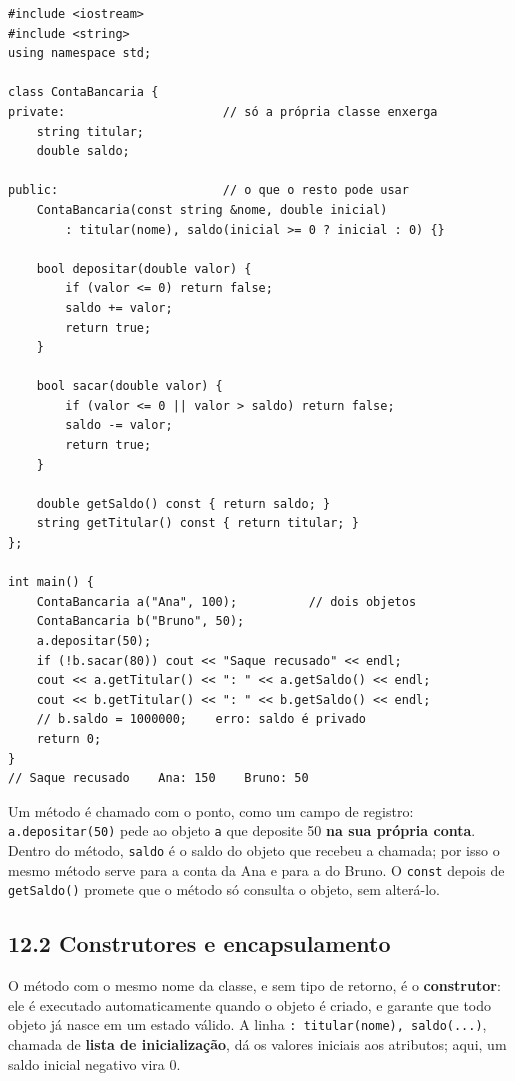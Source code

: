 \begin{codigo}
\begin{Verbatim}[breaklines=true, breaksymbolleft={}, fontsize=\footnotesize]
#include <iostream>
#include <string>
using namespace std;

class ContaBancaria {
private:                      // só a própria classe enxerga
    string titular;
    double saldo;

public:                       // o que o resto pode usar
    ContaBancaria(const string &nome, double inicial)
        : titular(nome), saldo(inicial >= 0 ? inicial : 0) {}

    bool depositar(double valor) {
        if (valor <= 0) return false;
        saldo += valor;
        return true;
    }

    bool sacar(double valor) {
        if (valor <= 0 || valor > saldo) return false;
        saldo -= valor;
        return true;
    }

    double getSaldo() const { return saldo; }
    string getTitular() const { return titular; }
};

int main() {
    ContaBancaria a("Ana", 100);          // dois objetos
    ContaBancaria b("Bruno", 50);
    a.depositar(50);
    if (!b.sacar(80)) cout << "Saque recusado" << endl;
    cout << a.getTitular() << ": " << a.getSaldo() << endl;
    cout << b.getTitular() << ": " << b.getSaldo() << endl;
    // b.saldo = 1000000;    erro: saldo é privado
    return 0;
}
// Saque recusado    Ana: 150    Bruno: 50
\end{Verbatim}
\end{codigo}

Um método é chamado com o ponto, como um campo de registro: \texttt{a.depositar(50)} pede ao objeto \texttt{a} que deposite 50 \textbf{na sua própria conta}. Dentro do método, \texttt{saldo} é o saldo do objeto que recebeu a chamada; por isso o mesmo método serve para a conta da Ana e para a do Bruno. O \texttt{const} depois de \texttt{getSaldo()} promete que o método só consulta o objeto, sem alterá-lo.

\subsection{12.2 Construtores e encapsulamento}

O método com o mesmo nome da classe, e sem tipo de retorno, é o \textbf{construtor}: ele é executado automaticamente quando o objeto é criado, e garante que todo objeto já nasce em um estado válido. A linha \texttt{: titular(nome), saldo(...)}, chamada de \textbf{lista de inicialização}, dá os valores iniciais aos atributos; aqui, um saldo inicial negativo vira 0.

